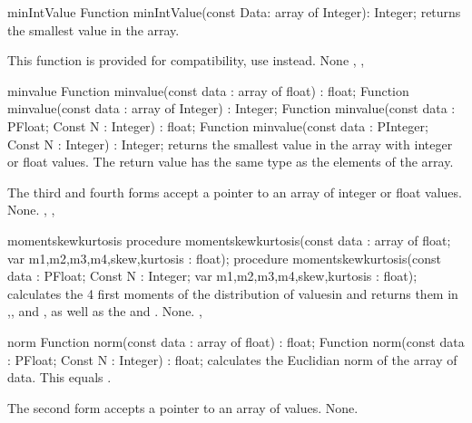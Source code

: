 
\begin{function}{minIntValue}
\Declaration
Function minIntValue(const Data: array of Integer): Integer;
\Description
{} returns the smallest value in the  array.

This function is provided for \delphi compatibility, use 
instead.
\Errors
None
\SeeAlso
{}, , 
\end{function}



\begin{function}{minvalue}
\Declaration
Function minvalue(const data : array of float) : float;
Function minvalue(const data : array of Integer) : Integer;
Function minvalue(const data : PFloat; Const N : Integer) : float;
Function minvalue(const data : PInteger; Const N : Integer) : Integer;
\Description
{} returns the smallest value in the  
array with integer or float values. The return value has 
the same type as the elements of the array.

The third and fourth forms accept a pointer to an array of  
integer or float values.
\Errors
None.
\SeeAlso
{}, , 
\end{function}



\begin{procedure}{momentskewkurtosis}
\Declaration
procedure momentskewkurtosis(const data : array of float;
  var m1,m2,m3,m4,skew,kurtosis : float);
procedure momentskewkurtosis(const data : PFloat; Const N : Integer;
  var m1,m2,m3,m4,skew,kurtosis : float);
\Description
{} calculates the 4 first moments of the distribution
of valuesin  and returns them in ,, and
, as well as the  and .
\Errors
None.
\SeeAlso
{}, 
\end{procedure}


\begin{function}{norm}
\Declaration
Function norm(const data : array of float) : float;
Function norm(const data : PFloat; Const N : Integer) : float;
\Description
{} calculates the Euclidian norm of the array of data.
This equals .

The second form accepts a pointer to an array of  values.
\Errors
None.
\SeeAlso
{}
\end{function}

